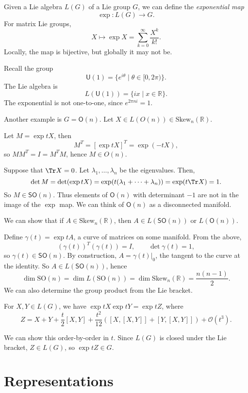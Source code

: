 \documentclass[12pt]{article}
\begin{document}
Given a Lie algebra $L(G)$ of a Lie group $G$, we can define the \emph{exponential map}
\[
\exp : L(G) \to G.
\]
For matrix Lie groups,
\[
X \mapsto \exp X = \sum_{k = 0}^\infty \frac{X^k}{k!}.
\]
Locally, the map is bijective, but globally it may not be.
\begin{exbox}
	Recall the group
	\[
		\mathsf{U}(1) = \{ e^{i\theta} \mid \theta \in [0, 2\pi)\}.
	\]
	The Lie algebra is
	\[
		L(\mathsf{U}(1)) = \{ ix \mid x \in \mathbb{R}\}.
	\]
	The exponential is not one-to-one, since $e^{2 \pi n i} = 1$.

	Another example is $G = \mathsf{O}(n)$. Let $X \in L(O(n)) \in \mathrm{Skew}_n(\mathbb{R})$.

	Let $M = \exp t X$, then
	\[
		M^T = [\exp tX]^T = \exp(-t X),
	\]
	so $MM^T = I = M^T M$, hence $M \in O(n)$.

	Suppose that $\Tr X = 0$. Let $\lambda_1, \ldots, \lambda_n$ be the eigenvalues. Then,
	\[
	\det M = \det (\exp t X) = \exp(t(\lambda_1 + \cdots + \lambda_n)) = \exp (t \Tr X) = 1.
	\]
	So $M \in \mathsf{SO}(n)$. Thus elements of $\mathsf{O}(n)$ with determinant $-1$ are not in the image of the $\exp$ map. We can think of $\mathsf{O}(n)$ as a disconnected manifold.
\end{exbox}

We can show that if $A \in \mathrm{Skew}_n(\mathbb{R})$, then $A \in L(\mathsf{SO}(n))$ or $L(\mathsf{O}(n))$.

Define $\gamma(t) = \exp t A$, a curve of matrices on some manifold. From the above,
\[
	(\gamma(t))^T(\gamma(t)) = I, \qquad \det \gamma(t) = 1,
\]
so $\gamma(t) \in \mathsf{SO}(n)$. By construction, $A = \gamma(t)|_0$, the tangent to the curve at the identity. So $A \in L(\mathsf{SO}(n))$, hence
\[
\dim \mathrm{SO}(n) = \dim L(\mathrm{SO}(n)) = \dim \mathrm{Skew}_n(\mathbb{R}) = \frac{n(n-1)}{2}.
\]
We can also determine the group product from the Lie bracket.
\begin{lemma}
	For $X, Y \in L(G)$, we have $\exp tX \exp tY = \exp tZ$, where
	\[
		Z = X + Y + \frac{t}{2}[X, Y] + \frac{t^2}{12}([X, [X, Y]] + [Y, [X, Y]]) + \mathcal{O}(t^3).
	\]
\end{lemma}

We can show this order-by-order in $t$.  Since $L(G)$ is closed under the Lie bracket, $Z \in L(G)$, so $\exp t Z \in G$.

\newpage

\section{Representations}%
\label{sec:rep}
\end{document}
